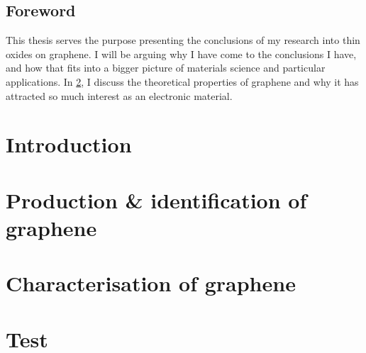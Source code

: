 \documentclass{report}
\begin{document}
	\newpage 
	\renewcommand{\baselinestretch}{0.94}\normalsize
	\tableofcontents
	\renewcommand{\baselinestretch}{1}\normalsize
	
	\section{Foreword}
	This thesis serves the purpose presenting the conclusions of my research into thin oxides on graphene. I will be arguing why I have come to the conclusions I have, and how that fits into a bigger picture of materials science and particular applications.
	In \cref{chap:introduction}, I discuss the theoretical properties of graphene and why it has attracted so much interest as an electronic material. 
	
	\chapter{Introduction}\label{chap:introduction}
	
	
	\chapter{Production \& identification of graphene}\label{chap:production&identification}
	
	
	\chapter{Characterisation of graphene}\label{chap:characterisation}
	
	
	\chapter{Test}
	
	
	


\end{document}
